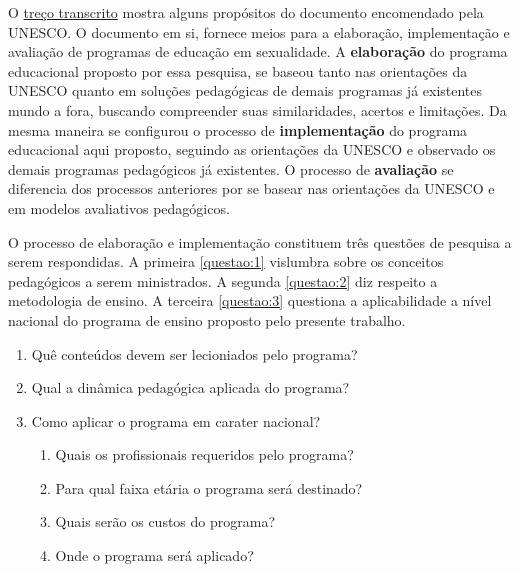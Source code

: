 
O \hyperref[UNESCO]{treço transcrito} mostra alguns propósitos do documento encomendado pela UNESCO. O documento em si, fornece meios para a elaboração, implementação e avaliação de programas de educação em sexualidade. A \textbf{elaboração} do programa educacional proposto por essa pesquisa, se baseou tanto nas orientações da UNESCO quanto em soluções pedagógicas de demais programas já existentes mundo a fora, buscando compreender suas similaridades, acertos e limitações. Da mesma maneira se configurou o processo de \textbf{implementação} do programa educacional aqui proposto, seguindo as orientações da UNESCO e observado os demais programas pedagógicos já existentes. O processo de \textbf{avaliação} se diferencia dos processos anteriores por se basear nas orientações da UNESCO e em modelos avaliativos pedagógicos. 


O processo de elaboração e implementação constituem três questões de pesquisa a serem respondidas. A primeira \ref{questao:1} vislumbra sobre os conceitos pedagógicos a serem ministrados. A segunda \ref{questao:2} diz respeito a metodologia de ensino. A terceira \ref{questao:3} questiona a aplicabilidade a nível nacional do programa de ensino proposto pelo presente trabalho. 


\vspace{-0.6cm}
\begin{framed}
\begin{enumerate}[label=(\Roman*)]
  \vspace{-0.4cm}
  \item Quê conteúdos devem ser lecioniados pelo programa? \label{questao:1}
  \item Qual a dinâmica pedagógica aplicada do programa? \label{questao:2}
  \item Como aplicar o programa em carater nacional? \label{questao:3}
  \begin{enumerate}[label=(\alph*)]
    \item Quais os profissionais requeridos pelo programa? \label{questao:a}
    \item Para qual faixa etária o programa será destinado? \label{questao:b}
    \item Quais serão os custos do programa? \label{questao:c}
    \item Onde o programa será aplicado? \label{questao:d}
    \vspace{-0.4cm}
  \end{enumerate}
\end{enumerate}
\end{framed}

